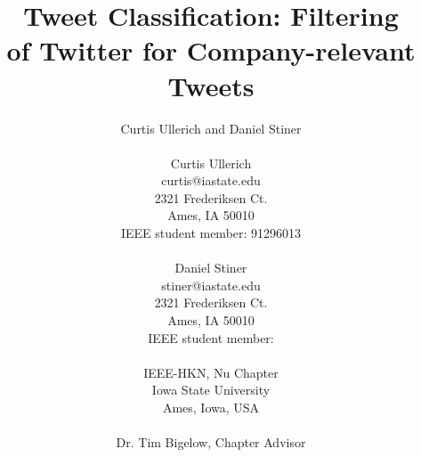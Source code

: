 \documentclass[letterpaper]{article}
\begin{document}
\title{Tweet Classification: Filtering \\ of Twitter for Company-relevant Tweets}
\author{
Curtis Ullerich and Daniel Stiner\\
\\
Curtis Ullerich\\
curtis@iastate.edu\\
2321 Frederiksen Ct.\\
Ames, IA 50010\\
IEEE student member: 91296013\\
\\
Daniel Stiner\\
stiner@iastate.edu\\
2321 Frederiksen Ct.\\
Ames, IA 50010\\
IEEE student member: \\
\\
IEEE-HKN, Nu Chapter\\
Iowa State University\\
Ames, Iowa, USA\\
\\
Dr. Tim Bigelow, Chapter Advisor\\
}
\maketitle
\end{document}

